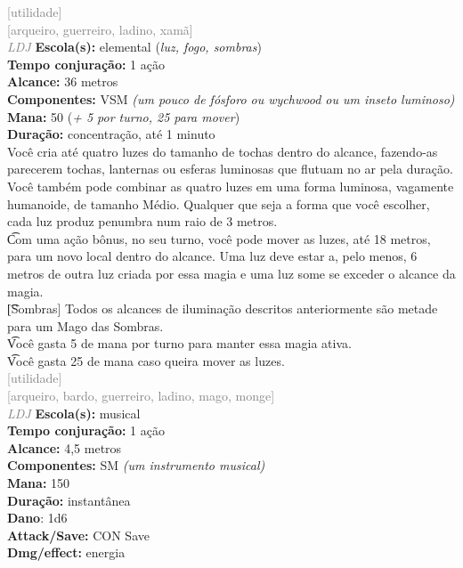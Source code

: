 \documentclass{RPG_Adventure}[2021/10/20]
\begin{document}
{\scriptsize \textcolor{gray}{[utilidade]\\}}
{\scriptsize \textcolor{gray}{[arqueiro, guerreiro, ladino, xamã]\\}}
{\tiny \textcolor{gray}{\textit{LDJ}}}
{\small \t \textbf{Escola(s):} elemental (\textit{luz, fogo, sombras})\\\t \textbf{Tempo conjuração:} 1 ação\\\t \textbf{Alcance:} 36 metros\\\t \textbf{Componentes:} VSM \textit{(um pouco de fósforo ou wychwood ou um inseto luminoso)}\\\t \textbf{Mana:} 50 (\textit{+ 5 por turno, 25 para mover})\\\t \textbf{Duração:} concentração, até 1 minuto\\}
{\normalsize Você cria até quatro luzes do tamanho de tochas dentro do alcance, fazendo-as parecerem tochas, lanternas ou esferas luminosas que flutuam no ar pela duração. Você também pode combinar as quatro luzes em uma forma luminosa, vagamente humanoide, de tamanho Médio. Qualquer que seja a forma que você escolher, cada luz produz penumbra num raio de 3 metros.\\\t Com uma ação bônus, no seu turno, você pode mover as luzes, até 18 metros, para um novo local dentro do alcance. Uma luz deve estar a, pelo menos, 6 metros de outra luz criada por essa magia e uma luz some se exceder o alcance da magia.\\\t [Sombras] Todos os alcances de iluminação descritos anteriormente são metade para um Mago das Sombras.\\\t Você gasta 5 de mana por turno para manter essa magia ativa.\\\t Você gasta 25 de mana caso queira mover as luzes.\\}
{\scriptsize \textcolor{gray}{[utilidade]\\}}
{\scriptsize \textcolor{gray}{[arqueiro, bardo, guerreiro, ladino, mago, monge]\\}}
{\tiny \textcolor{gray}{\textit{LDJ}}}
{\small \t \textbf{Escola(s):} musical\\\t \textbf{Tempo conjuração:} 1 ação\\\t \textbf{Alcance:} 4,5 metros\\\t \textbf{Componentes:} SM \textit{(um instrumento musical)}\\\t \textbf{Mana:} 150\\\t \textbf{Duração:} instantânea\\\t \textbf{Dano}: 1d6\\\t \textbf{Attack/Save:} CON Save\\\t \textbf{Dmg/effect:} energia\\}
\end{document}

